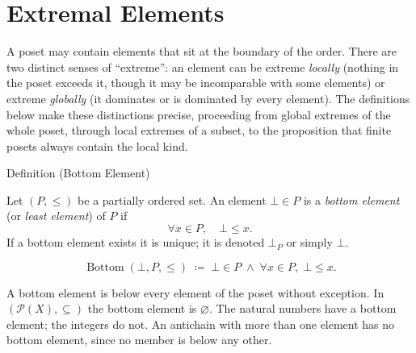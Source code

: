 
\section{Extremal Elements}
\label{sec:extremal-elements}

\begin{remark*}
A poset may contain elements that sit at the boundary of the order.  There
are two distinct senses of ``extreme'': an element can be extreme
\emph{locally} (nothing in the poset exceeds it, though it may be
incomparable with some elements) or extreme \emph{globally} (it dominates
or is dominated by every element).  The definitions below make these
distinctions precise, proceeding from global extremes of the whole poset,
through local extremes of a subset, to the proposition that finite posets
always contain the local kind.
\end{remark*}


\begin{definitionbox}{Definition (Bottom Element)}
\begin{definition}
\label{def:bottom-element}
Let $(P, \leq)$ be a partially ordered set.  An element $\bot \in P$ is
a \emph{bottom element} (or \emph{least element}) of $P$ if
\[
\forall x \in P, \quad \bot \leq x.
\]
If a bottom element exists it is unique; it is denoted $\bot_P$ or
simply $\bot$.
\end{definition}
\end{definitionbox}

\begin{remark*}
\[
\operatorname{Bottom}(\bot, P, \leq)
\;\coloneqq\;
\bot \in P \;\land\; \forall x \in P,\; \bot \leq x.
\]
\end{remark*}

\begin{remark*}[Interpretation]
A bottom element is below every element of the poset without exception.
In $(\mathcal{P}(X), \subseteq)$ the bottom element is $\varnothing$.
The natural numbers have a bottom element; the integers do not.
An antichain with more than one element has no bottom element, since no
member is below any other.
\end{remark*}

